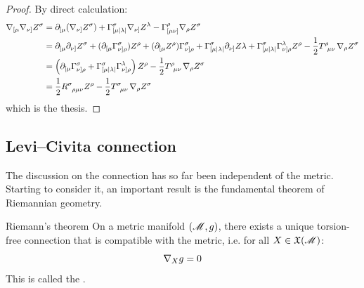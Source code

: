\begin{proofbox}
  \begin{proof}
    By direct calculation:
    \begin{equation*}
      \begin{split}
        \na_{[\mu} \na_{\nu]} Z^\sigma
        &= \pa_{[\mu} (\na_{\nu]} Z^\sigma) + \Gamma^\sigma_{[\mu | \lambda |} \na_{\nu]} Z^\lambda - \Gamma^\rho_{[\mu \nu]} \na_\rho Z^\sigma \\
        &= \pa_{[\mu} \pa_{\nu]} Z^\sigma + (\pa_{[\mu} \Gamma^\sigma_{\nu]\rho}) Z^\rho + (\pa_{[\mu} Z^\rho) \Gamma^\sigma_{\nu]\rho} + \Gamma^\sigma_{[\mu | \lambda |} \pa_{\nu]} Z\lambda + \Gamma^\sigma_{[\mu | \lambda |} \Gamma^\lambda_{\nu] \rho} Z^\rho - \frac{1}{2} \tensor{T}{^\rho_{\mu \nu}} \na_\rho Z^\sigma \\
        &= \left( \pa_{[\mu} \Gamma^\sigma_{\nu]\rho} + \Gamma^\sigma_{[\mu | \lambda |} \Gamma^\lambda_{\nu]\rho} \right) Z^\rho - \frac{1}{2} \tensor{T}{^\rho_{\mu \nu}} \na_\rho Z^\sigma \\
        &= \frac{1}{2} \tensor{R}{^\sigma_{\rho \mu \nu}} Z^\rho - \frac{1}{2} \tensor{T}{^\sigma_{\mu \nu}} \na_\rho Z^\sigma
      \end{split}
    \end{equation*}
    which is the thesis.
  \end{proof}
\end{proofbox}

\subsection{Levi--Civita connection}

The discussion on the connection has so far been independent of the metric. Starting to consider it, an important result is the fundamental theorem of Riemannian geometry.

\begin{theorem}{Riemann's theorem}{}
  On a metric manifold $ (\mathscr{M},g) $, there exists a unique torsion-free connection that is compatible with the metric, i.e. for all $ X \in \mathfrak{X}(\mathscr{M}) $:
  \begin{equation}
    \nabla_X g = 0
  \end{equation}
  This is called the .
\end{theorem}


